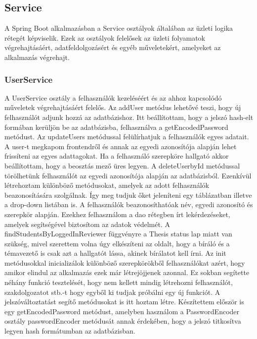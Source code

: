 \newpage
\subsection{Service}

A Spring Boot alkalmazásban a Service osztályok általában az üzleti logika rétegét képviselik. Ezek az osztályok felelősek az üzleti folyamatok végrehajtásáért, adatfeldolgozásért és egyéb műveletekért, amelyeket az alkalmazás végrehajt.

\subsubsection{UserService}

A UserService osztály a felhasználók kezeléséért és az ahhoz kapcsolódó műveletek végrehajtásáért felelős. Az addUser metódus lehetővé teszi, hogy új felhasználót adjunk hozzá az adatbázishoz. Itt beállítottam, hogy a jelszó hash-elt formában kerüljön be az adatbázisba, felhasználva a getEncodedPassword metódust. Az updateUsers metódussal felülírhatjuk a felhasználók egyes adatait. A user-t megkapom frontendről és annak az egyedi azonosítója alapján lehet frissíteni az egyes adattagokat. Ha a felhasználó szerepköre hallgató akkor beállítottam, hogy a beosztás mező üres legyen. A deleteUserbyId metódussal törölhetünk felhasználót az egyedi azonosítója alapján az adatbázisból. Ezenkívül létrehoztam különböző metódusokat, amelyek az adott felhasználók beazonosítására szolgálnak. Így meg tudjuk őket jeleníteni egy táblázatban illetve a drop-down listában is. A felhasználók beazonosíthatóak név, egyedi azonosító és szerepkör alapján.
Ezekhez felhasználom a dao rétegben írt lekérdezéseket, amelyek segítségével biztosítom az adatok védelmét. A findStudentsByLoggedInReviewer függvényre a Thesis status lap miatt van szükség, mivel szerettem volna úgy elkészíteni az oldalt, hogy a bíráló és a témavezető is csak azt a hallgatót lássa, akinek bírálatot kell írni. Az init metódusokkal inicializálok különböző szerepkörökből felhasználókat azért, hogy amikor elindul az alkalmazás ezek már létrejöjjenek azonnal. Ez sokban segítette néhány funkció tesztelését, hogy nem kellett mindig létrehozni felhasználót, szakdolgozatot stb.-t hogy egyből ki tudjak próbálni egy új funkciót. A jelszóváltoztatást segítő metódusokat is itt hoztam létre. Készítettem először is egy getEncodedPassword metódust, amelyben használom a PasswordEncoder osztály passwordEncoder metódusát annak érdekében, hogy a jelszó titkosítva legyen hash formátumban az adatbázisban.


